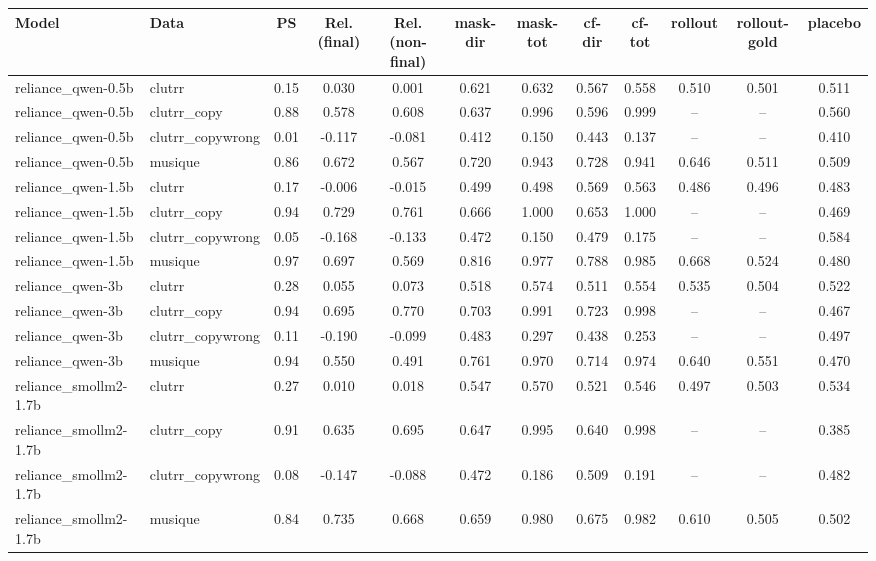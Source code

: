 \begin{tabular}{llcccccccccc}
\toprule
Model & Data & PS & Rel.(final) & Rel.(non-final) & mask-dir & mask-tot & cf-dir & cf-tot & rollout & rollout-gold & placebo \\
\midrule
reliance_qwen-0.5b & clutrr & 0.15 & 0.030 & 0.001 & 0.621 & 0.632 & 0.567 & 0.558 & 0.510 & 0.501 & 0.511 \\
reliance_qwen-0.5b & clutrr_copy & 0.88 & 0.578 & 0.608 & 0.637 & 0.996 & 0.596 & 0.999 & -- & -- & 0.560 \\
reliance_qwen-0.5b & clutrr_copywrong & 0.01 & -0.117 & -0.081 & 0.412 & 0.150 & 0.443 & 0.137 & -- & -- & 0.410 \\
reliance_qwen-0.5b & musique & 0.86 & 0.672 & 0.567 & 0.720 & 0.943 & 0.728 & 0.941 & 0.646 & 0.511 & 0.509 \\
reliance_qwen-1.5b & clutrr & 0.17 & -0.006 & -0.015 & 0.499 & 0.498 & 0.569 & 0.563 & 0.486 & 0.496 & 0.483 \\
reliance_qwen-1.5b & clutrr_copy & 0.94 & 0.729 & 0.761 & 0.666 & 1.000 & 0.653 & 1.000 & -- & -- & 0.469 \\
reliance_qwen-1.5b & clutrr_copywrong & 0.05 & -0.168 & -0.133 & 0.472 & 0.150 & 0.479 & 0.175 & -- & -- & 0.584 \\
reliance_qwen-1.5b & musique & 0.97 & 0.697 & 0.569 & 0.816 & 0.977 & 0.788 & 0.985 & 0.668 & 0.524 & 0.480 \\
reliance_qwen-3b & clutrr & 0.28 & 0.055 & 0.073 & 0.518 & 0.574 & 0.511 & 0.554 & 0.535 & 0.504 & 0.522 \\
reliance_qwen-3b & clutrr_copy & 0.94 & 0.695 & 0.770 & 0.703 & 0.991 & 0.723 & 0.998 & -- & -- & 0.467 \\
reliance_qwen-3b & clutrr_copywrong & 0.11 & -0.190 & -0.099 & 0.483 & 0.297 & 0.438 & 0.253 & -- & -- & 0.497 \\
reliance_qwen-3b & musique & 0.94 & 0.550 & 0.491 & 0.761 & 0.970 & 0.714 & 0.974 & 0.640 & 0.551 & 0.470 \\
reliance_smollm2-1.7b & clutrr & 0.27 & 0.010 & 0.018 & 0.547 & 0.570 & 0.521 & 0.546 & 0.497 & 0.503 & 0.534 \\
reliance_smollm2-1.7b & clutrr_copy & 0.91 & 0.635 & 0.695 & 0.647 & 0.995 & 0.640 & 0.998 & -- & -- & 0.385 \\
reliance_smollm2-1.7b & clutrr_copywrong & 0.08 & -0.147 & -0.088 & 0.472 & 0.186 & 0.509 & 0.191 & -- & -- & 0.482 \\
reliance_smollm2-1.7b & musique & 0.84 & 0.735 & 0.668 & 0.659 & 0.980 & 0.675 & 0.982 & 0.610 & 0.505 & 0.502 \\
\bottomrule
\end{tabular}
